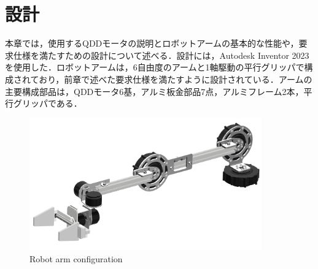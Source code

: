 \chapter{設計}
\label{chap:third}
%
本章では，使用するQDDモータの説明とロボットアームの基本的な性能や，要求仕様を満たすための設計について述べる．設計には，Autodesk Inventor 2023を使用した．ロボットアームは，6自由度のアームと1軸駆動の平行グリッパで構成されており，前章で述べた要求仕様を満たすように設計されている．アームの主要構成部品は，QDDモータ6基，アルミ板金部品7点，アルミフレーム2本，平行グリッパである．
\begin{figure}[h]
  \centering
  \includegraphics[width=10cm]{images/arm_design.png}
  \caption{Robot arm configuration}
  \label{fig:arm_design}
\end{figure}





%